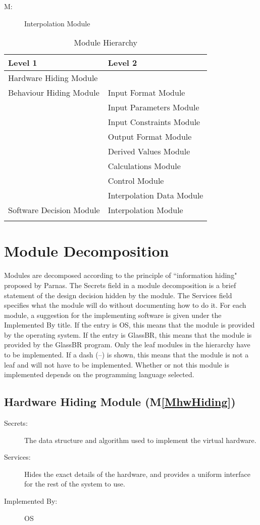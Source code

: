 \documentclass[12pt]{article}
\newcounter{modnum}
\newcommand{\mthemodnum}{M\themodnum}
\begin{document}
\begin{description}
\item[\mthemodnum\label{MmodInterpolation}:]Interpolation Module
\end{description}
\begin{longtable}{l l}
\toprule
Level 1 & Level 2
\\
\midrule
Hardware Hiding Module & 
\\
Behaviour Hiding Module & Input Format Module
\\
 & Input Parameters Module
\\
 & Input Constraints Module
\\
 & Output Format Module
\\
 & Derived Values Module
\\
 & Calculations Module
\\
 & Control Module
\\
 & Interpolation Data Module
\\
Software Decision Module & Interpolation Module
\\
\bottomrule
\caption{Module Hierarchy}
\label{Table:MH}
\end{longtable}
\section{Module Decomposition}
\label{Sec:MD}
Modules are decomposed according to the principle of ``information hiding" proposed by Parnas. The Secrets field in a module decomposition is a brief statement of the design decision hidden by the module. The Services field specifies what the module will do without documenting how to do it. For each module, a suggestion for the implementing software is given under the Implemented By title. If the entry is OS, this means that the module is provided by the operating system. If the entry is GlassBR, this means that the module is provided by the GlassBR program. Only the leaf modules in the hierarchy have to be implemented. If a dash (--) is shown, this means that the module is not a leaf and will not have to be implemented. Whether or not this module is implemented depends on the programming language selected.
\subsection{Hardware Hiding Module (M\ref{MhwHiding})}
\label{Sec:HHM()}
\begin{description}
\item[Secrets:]The data structure and algorithm used to implement the virtual hardware.
\item[Services:]Hides the exact details of the hardware, and provides a uniform interface for the rest of the system to use.
\item[Implemented By:]OS
\end{description}
\end{document}
